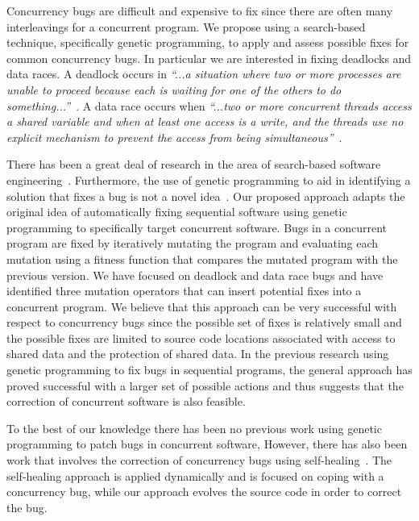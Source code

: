 \documentclass[10pt, conference, compsocconf]{IEEEtran}
\begin{document}
Concurrency bugs are difficult and expensive to fix since there are often many interleavings for a concurrent program. We propose using a search-based technique, specifically genetic programming, to apply and assess possible fixes for common concurrency bugs. In particular we are interested in fixing deadlocks and data races. A deadlock occurs in  \emph{``...a situation where two or more processes are unable to proceed because each is waiting for one of the others to do something...''}~\cite{LSW05}. A data race occurs when \emph{``...two or more concurrent threads access a shared variable and when at least one access is a write, and the threads use no explicit mechanism to prevent the access from being simultaneous''}~\cite{LSW05}.

There has been a great deal of research in the area of search-based software engineering~\cite{Har+10}. Furthermore, the use of genetic programming to aid in identifying a solution that fixes a bug is not a novel idea~\cite{FNWG09, AY08, Arc08, WT10, WNLF09, WFGN10}. Our proposed approach adapts the original idea of automatically fixing sequential software using genetic programming to specifically target concurrent software. Bugs in a concurrent program are fixed by iteratively mutating the program and evaluating each mutation using a fitness function that compares the mutated program with the previous version. We have focused on deadlock and data race bugs and have identified three mutation operators that can insert potential fixes into a concurrent program. We believe that this approach can be very successful with respect to concurrency bugs since the possible set of fixes is relatively small and the possible fixes are limited to source code locations associated with access to shared data and the protection of shared data. In the previous research using genetic programming to fix bugs in sequential programs, the general approach has proved successful with a larger set of possible actions and thus suggests that the correction of concurrent software is also feasible.

To the best of our knowledge there has been no previous work using genetic programming to patch bugs in concurrent software, However, there has also been work that involves the correction of concurrency bugs using self-healing~\cite{LVK08}. The self-healing approach is applied dynamically and is focused on coping with a concurrency bug, while our approach evolves the source code in order to correct the bug.

\end{document}
